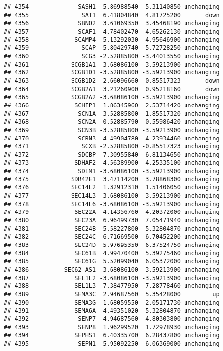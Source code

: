 \documentclass[]{article}
\begin{document}
\begin{verbatim}
## 4354              SASH1  5.86988540  5.31140850 unchanging
## 4355               SAT1  6.41804840  4.81725200       down
## 4356              SBNO2  3.61069350  3.45468190 unchanging
## 4357              SCAF1  4.78402470  4.65262130 unchanging
## 4358             SCAMP4  5.13292030  4.95646900 unchanging
## 4359               SCAP  5.80429740  5.72728250 unchanging
## 4360               SCG3 -2.52885800 -3.44013550 unchanging
## 4361            SCGB1A1 -3.68086100 -3.59213900 unchanging
## 4362            SCGB1D1 -3.52885800 -3.59213900 unchanging
## 4363            SCGB1D2  2.66096660 -0.85517323       down
## 4364            SCGB2A1  3.21260900  0.95218160       down
## 4365            SCGB2A2 -3.68086100 -3.59213900 unchanging
## 4366             SCHIP1  1.86345960  2.53714420 unchanging
## 4367              SCN1A -3.52885800 -1.85517320 unchanging
## 4368              SCN2A -0.52885790  0.55986420 unchanging
## 4369              SCN3B -3.52885800 -3.59213900 unchanging
## 4370              SCRN3  4.49904780  4.23934460 unchanging
## 4371               SCXB -2.52885800 -0.85517323 unchanging
## 4372              SDCBP  7.30955840  6.81134650 unchanging
## 4373             SDHAF2  4.56389900  4.25335100 unchanging
## 4374              SDIM1 -3.68086100 -3.59213900 unchanging
## 4375            SDR42E1  3.47114200  3.78868300 unchanging
## 4376            SEC14L2  1.32912310  1.51406050 unchanging
## 4377            SEC14L3 -3.68086100 -3.59213900 unchanging
## 4378            SEC14L6 -3.68086100 -3.59213900 unchanging
## 4379             SEC22A  4.14356760  4.20372000 unchanging
## 4380             SEC23A  6.96499730  7.05471940 unchanging
## 4381             SEC24B  5.58227800  5.32804870 unchanging
## 4382             SEC24C  6.71669500  6.70452200 unchanging
## 4383             SEC24D  5.97695350  6.37524750 unchanging
## 4384             SEC61B  4.99470400  5.39275460 unchanging
## 4385             SEC61G  5.52099040  6.05372000 unchanging
## 4386          SEC62-AS1 -3.68086100 -3.59213900 unchanging
## 4387             SEL1L2 -3.68086100 -3.59213900 unchanging
## 4388             SEL1L3  7.38477950  7.28778460 unchanging
## 4389             SEMA3C  2.94687560  5.35428000         up
## 4390             SEMA3G  1.68059550  2.05171730 unchanging
## 4391             SEMA6A  4.49351020  5.32804870 unchanging
## 4392              SENP7  4.94687560  4.80303800 unchanging
## 4393              SENP8  1.96299520  1.72978930 unchanging
## 4394             SEPHS1  6.40335700  6.28437800 unchanging
## 4395              SEPN1  5.95092250  6.06369000 unchanging

\end{verbatim}
\end{document}
